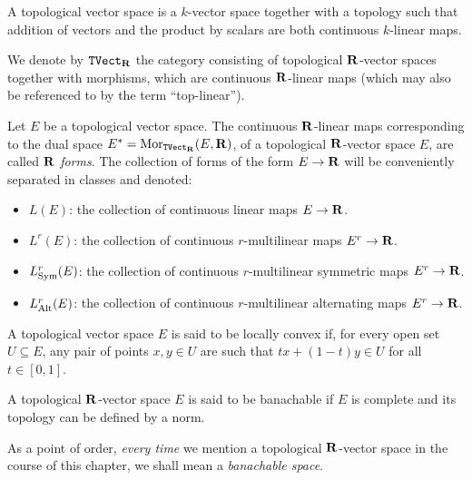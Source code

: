 \begin{definition}
    \label{def:topological-vector-space}
    A topological vector space is a \(k\)-vector space together with a topology
    such that addition of vectors and the product by scalars are both continuous
    \(k\)-linear maps.

    We denote by \({\texttt{TVect}}_{\mathbf{R}}\) the category consisting of topological
    \(\mathbf{R}\)-vector spaces together with morphisms, which are continuous \(\mathbf{R}\)-linear
    maps (which may also be referenced to by the term ``top-linear'').

    Let \(E\) be a topological vector space. The continuous \(\mathbf{R}\)-linear maps
    corresponding to the dual space \(E^{*} = \operatorname{Mor}_{{\texttt{TVect}}_{\mathbf{R}}}(E, \mathbf{R})\), of a
    topological \(\mathbf{R}\)-vector space \(E\), are called \(\mathbf{R}\) \emph{forms}. The
    collection of forms of the form \(E \to \mathbf{R}\) will be conveniently separated in
    classes and denoted:
    \begin{itemize}\setlength\itemsep{0em}
        \item \(L(E)\): the collection of continuous linear maps \(E \to \mathbf{R}\).
        \item \(L^r(E)\): the collection of continuous \(r\)-multilinear maps \(E^r \to \mathbf{R}\).
        \item \(L^r_{\operatorname{Sym}}(E)\): the collection of continuous \(r\)-multilinear
              symmetric maps \(E^r \to \mathbf{R}\).
        \item \(L^r_{\operatorname{Alt}}(E)\): the collection of continuous \(r\)-multilinear
              alternating maps \(E^r \to \mathbf{R}\).
    \end{itemize}
\end{definition}

\begin{definition}
    \label{def:locally-convex}
    A topological vector space \(E\) is said to be locally convex if, for every open
    set \(U \subseteq E\), any pair of points \(x, y \in U\) are such that \(t x +
    (1 - t) y \in U\) for all \(t \in [0, 1]\).
\end{definition}

\begin{definition}[Banachable]
    \label{def:banachable}
    A topological \(\mathbf{R}\)-vector space \(E\) is said to be banachable if \(E\) is
    complete and its topology can be defined by a norm.
\end{definition}

As a point of order, \emph{every time} we mention a topological \(\mathbf{R}\)-vector
space in the course of this chapter, we shall mean a \emph{banachable space}.

